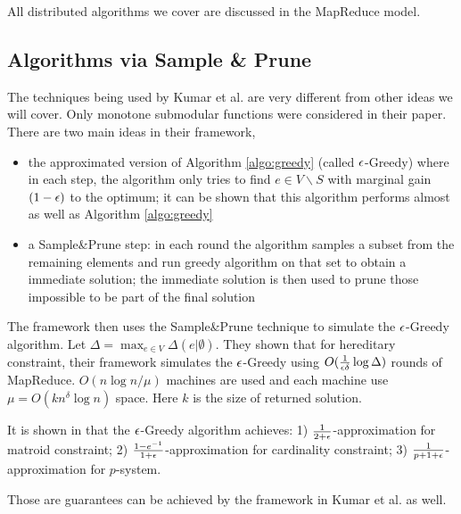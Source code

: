 All distributed algorithms we cover are discussed in the MapReduce model.

\subsection{Algorithms via Sample \& Prune}
The techniques being used by Kumar et al. \cite{KMV+15} are very different from other ideas we will cover. Only monotone submodular functions were considered in their paper. There are two main ideas in their framework,
\begin{itemize}
\item the approximated version of Algorithm \ref{algo:greedy} (called {\sc $\epsilon$-Greedy}) where in each step, the algorithm only tries to find $e\in V\backslash S$ with marginal gain $(1 - \epsilon)$ to the optimum; it can be shown that this algorithm performs almost as well as Algorithm \ref{algo:greedy}
\item a Sample\&Prune step: in each round the algorithm samples a subset from the remaining elements and run greedy algorithm on that set to obtain a immediate solution;  the immediate solution is then used to prune those impossible to be part of the final solution
\end{itemize}

The framework then uses the Sample\&Prune technique to simulate the {\sc $\epsilon$-Greedy} algorithm. Let $\Delta = \max_{e\in V} \Delta(e|\emptyset)$. They shown that for hereditary constraint, their framework simulates the {\sc $\epsilon$-Greedy} using $O(\frac{1}{\epsilon \delta}\log \Delta)$ rounds of MapReduce. $O(n\log n / \mu)$ machines are used and each machine use $\mu = O(k n^{\delta}\log n)$ space. Here $k$ is the size of returned solution.

It is shown in \cite{CCP+11} that the {\sc $\epsilon$-Greedy} algorithm achieves: 1)  $\frac{1}{2+\epsilon}$-approximation for matroid constraint; 2) $\frac{1 - e^{-1}}{1 + \epsilon}$-approximation for cardinality constraint; 3) $\frac{1}{p + 1 + \epsilon}$-approximation for $p$-system.

Those are guarantees can be achieved by the framework in Kumar et al. \cite{KMV+15} as well.



